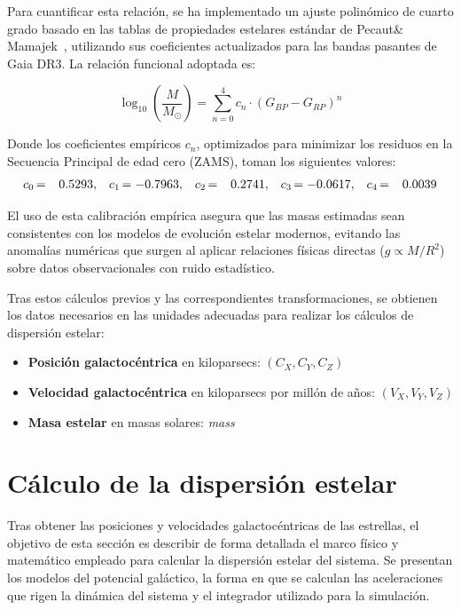 Para cuantificar esta relación, se ha implementado un ajuste polinómico de cuarto grado basado en las tablas de propiedades estelares estándar de Pecaut\& Mamajek~\cite{pecaut2013}, utilizando sus coeficientes actualizados para las bandas pasantes de Gaia DR3. La relación funcional adoptada es:

\[
    \log_{10}\left(\frac{M}{M_\odot}\right) = \sum_{n=0}^{4} c_n \cdot (G_{BP}-G_{RP})^n
\]

Donde los coeficientes empíricos $c_n$, optimizados para minimizar los residuos en la Secuencia Principal de edad cero (ZAMS), toman los siguientes valores:
\[    \begin{array}{r@{\,}l@{\quad}r@{\,}l@{\quad}r@{\,}l@{\quad}r@{\,}l@{\quad}r@{\,}l}
        c_0 &= \phantom{-}0.5293, & c_1 &= -0.7963, & c_2 &= \phantom{-}0.2741, & c_3 &= -0.0617, & c_4 &= \phantom{-}0.0039
    \end{array}\]

El uso de esta calibración empírica asegura que las masas estimadas sean consistentes con los modelos de evolución estelar modernos, evitando las anomalías numéricas que surgen al aplicar relaciones físicas directas ($g \propto M/R^2$) sobre datos observacionales con ruido estadístico.

Tras estos cálculos previos y las correspondientes transformaciones, se obtienen los datos necesarios en las unidades adecuadas para realizar los cálculos de dispersión estelar:

\begin{itemize}
    \item \textbf{Posición galactocéntrica} en kiloparsecs: \((C_X, C_Y, C_Z)\)
    \item \textbf{Velocidad galactocéntrica} en kiloparsecs por millón de años: \((V_X, V_Y, V_Z)\)
    \item \textbf{Masa estelar} en masas solares: \textit{mass}
\end{itemize}

\section{Cálculo de la dispersión estelar}\label{sec:dispersion}

Tras obtener las posiciones y velocidades galactocéntricas de las estrellas, el objetivo de esta sección es describir de forma detallada el marco físico y matemático empleado para calcular la dispersión estelar del sistema.
Se presentan los modelos del potencial galáctico, la forma en que se calculan las aceleraciones que rigen la dinámica del sistema y el integrador utilizado para la simulación.

